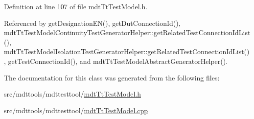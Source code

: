 Definition at line 107 of file mdt\-Tt\-Test\-Model.\-h.



Referenced by get\-Designation\-E\-N(), get\-Dut\-Connection\-Id(), mdt\-Tt\-Test\-Model\-Continuity\-Test\-Generator\-Helper\-::get\-Related\-Test\-Connection\-Id\-List(), mdt\-Tt\-Test\-Model\-Isolation\-Test\-Generator\-Helper\-::get\-Related\-Test\-Connection\-Id\-List(), get\-Test\-Connection\-Id(), and mdt\-Tt\-Test\-Model\-Abstract\-Generator\-Helper().



The documentation for this class was generated from the following files\-:\begin{DoxyCompactItemize}
\item 
src/mdttools/mdttesttool/\hyperlink{mdt_tt_test_model_8h}{mdt\-Tt\-Test\-Model.\-h}\item 
src/mdttools/mdttesttool/\hyperlink{mdt_tt_test_model_8cpp}{mdt\-Tt\-Test\-Model.\-cpp}\end{DoxyCompactItemize}
